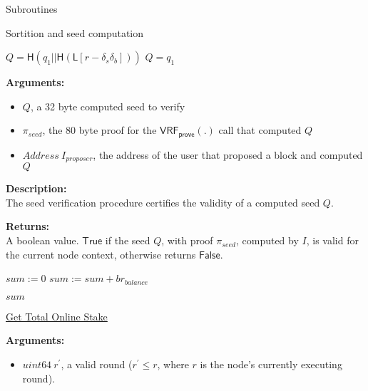\documentclass[10pt,a4paper]{article}
\begin{document}
\begin{section}{Subroutines}
\begin{subsection}{Sortition and seed computation}
\begin{algorithm}[H]
\begin{algorithmic}[1]
            \Return $Q = \mathsf{H}(q_1||\mathsf{H}(\mathsf{L}[r-\delta_s\delta_b]))$
        \Else
            \Return $Q = q_1$
        \EndIf
    \EndFunction
    \end{algorithmic}
\end{algorithm}


\noindent \textbf{Arguments:}
\begin{itemize}
    \item $Q$, a 32 byte computed seed to verify
    \item $\pi_{seed}$, the 80 byte proof for the $\mathsf{VRF_{prove}}(.)$ call that computed $Q$
    \item $Address \ I_{proposer}$, the address of the user that proposed a block and computed $Q$
  \end{itemize}


\noindent \textbf{Description:}\\ The seed verification procedure certifies the validity of a computed seed $Q$.


\noindent \textbf{Returns:}\\ A boolean value. $\mathsf{True}$ if the seed $Q$, with proof $\pi_{seed}$, computed by $I$,
    is valid for the current node context, otherwise returns $\mathsf{False}$.


\begin{algorithm}[H]\label{algo:get-total-online-stake}
    \begin{algorithmic}[1]
        
        \State $sum := 0$
                \State $sum := sum + br_{balance}$
            \EndIf
        \EndFor

        \Return $sum$

        \EndFunction
    \end{algorithmic}
    \caption{\underline{Get Total Online Stake}}
\end{algorithm}

\noindent \textbf{Arguments:}
\begin{itemize}
    \item $uint64 \ r^\prime$, a valid round ($r^\prime \leq r$, where $r$ is the node's currently executing round).
  \end{itemize}



\end{subsection}
\end{section}
\end{document}
